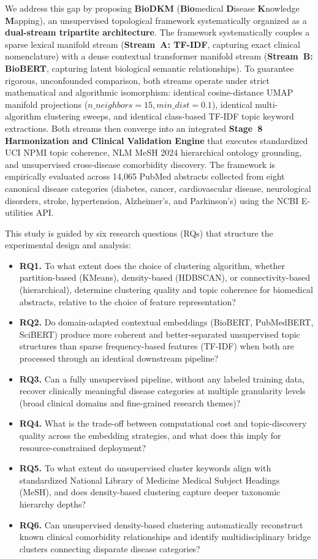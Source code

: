 \documentclass[a4paper,fleqn]{cas-dc}
\begin{document}
We address this gap by proposing \textbf{BioDKM} (\textbf{Bio}medical \textbf{D}isease \textbf{K}nowledge \textbf{M}apping), an unsupervised topological framework systematically organized as a \textbf{dual-stream tripartite architecture}. The framework systematically couples a sparse lexical manifold stream (\textbf{Stream~A: TF-IDF}, capturing exact clinical nomenclature) with a dense contextual transformer manifold stream (\textbf{Stream~B: BioBERT}, capturing latent biological semantic relationships). To guarantee rigorous, unconfounded comparison, both streams operate under strict mathematical and algorithmic isomorphism: identical cosine-distance UMAP manifold projections ($n\_neighbors=15, min\_dist=0.1$), identical multi-algorithm clustering sweeps, and identical class-based TF-IDF topic keyword extractions. Both streams then converge into an integrated \textbf{Stage~8 Harmonization and Clinical Validation Engine} that executes standardized UCI NPMI topic coherence, NLM MeSH 2024 hierarchical ontology grounding, and unsupervised cross-disease comorbidity discovery. The framework is empirically evaluated across 14,065 PubMed abstracts collected from eight canonical disease categories (diabetes, cancer, cardiovascular disease, neurological disorders, stroke, hypertension, Alzheimer's, and Parkinson's) using the NCBI E-utilities API.

This study is guided by six research questions (RQs) that structure the experimental design and analysis:
\begin{itemize}
\item \textbf{RQ1.} To what extent does the choice of clustering algorithm, whether partition-based (KMeans), density-based (HDBSCAN), or connectivity-based (hierarchical), determine clustering quality and topic coherence for biomedical abstracts, relative to the choice of feature representation?
\item \textbf{RQ2.} Do domain-adapted contextual embeddings (BioBERT, PubMedBERT, SciBERT) produce more coherent and better-separated unsupervised topic structures than sparse frequency-based features (TF-IDF) when both are processed through an identical downstream pipeline?
\item \textbf{RQ3.} Can a fully unsupervised pipeline, without any labeled training data, recover clinically meaningful disease categories at multiple granularity levels (broad clinical domains and fine-grained research themes)?
\item \textbf{RQ4.} What is the trade-off between computational cost and topic-discovery quality across the embedding strategies, and what does this imply for resource-constrained deployment?
\item \textbf{RQ5.} To what extent do unsupervised cluster keywords align with standardized National Library of Medicine Medical Subject Headings (MeSH), and does density-based clustering capture deeper taxonomic hierarchy depths?
\item \textbf{RQ6.} Can unsupervised density-based clustering automatically reconstruct known clinical comorbidity relationships and identify multidisciplinary bridge clusters connecting disparate disease categories?
\end{itemize}
\end{document}
